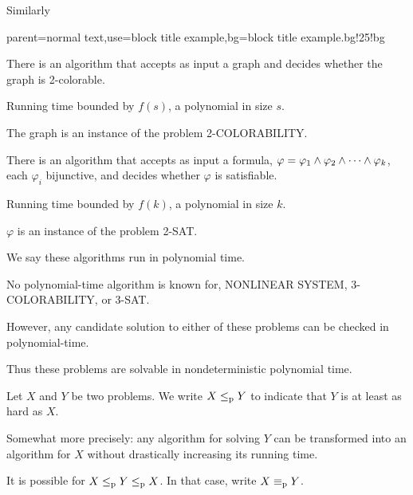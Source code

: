 \documentclass[12pt,xcolor=dvipsnames,mathserif%
   ]{beamer}
\newcommand{\bigpause}{\pause\bigskip}
\renewcommand{\.}{\cdot}
\newcommand{\reduc}{\leq_{\text{\textnormal{p}}}}
\newcommand{\equivp}{\equiv_{\text{\textnormal{p}}}}
\let\emph=\alert
\renewcommand{\phi}{\ensuremath{\varphi}}
\begin{document}
\begin{frame}
  Similarly

  {parent=normal text,use=block title example,bg=block title example.bg!25!bg}
  \begin{exampleblock}{}
    There is an algorithm that accepts as input a graph and decides
    whether the graph is 2-colorable.

    \smallskip
    Running time bounded by $f(s)$, a polynomial in 
    size $s$.
  \end{exampleblock}

  The graph is an \emph{instance} of the \emph{problem} 2-COLORABILITY.
  \begin{exampleblock}{}
  There is an algorithm that accepts as input a formula, $\phi = \phi_1 \meet \phi_2 \meet \cdots \meet \phi_k$, each $\phi_i$ bijunctive, and decides whether $\phi$ is satisfiable.
  
  \smallskip
  Running time bounded by $f(k)$, a polynomial in size $k$.
  \end{exampleblock}
  
  $\phi$ is an \emph{instance} of the \emph{problem} 2-SAT.

  We say these algorithms run in \emph{polynomial time}.
\end{frame}

\begin{frame}
  No polynomial-time algorithm is known for, NONLINEAR SYSTEM,
  3-COLORABILITY, or 3-SAT.

  \bigpause
  However, any candidate solution to either of these problems can be
  checked in polynomial-time. 

  \bigpause
  Thus these problems are solvable in \emph{nondeterministic polynomial
    time.} 
\end{frame}

\begin{frame}
  Let $X$ and $Y$ be two problems. We write $X \reduc Y$ to indicate that
  $Y$ is at least as hard as $X$.

  \bigpause
  Somewhat more precisely: any algorithm for solving $Y$ can be
  transformed into an algorithm for $X$ without drastically increasing
  its running time.

  \bigpause
  It is possible for $X\reduc Y \reduc X$. In that case, write $X\equivp
  Y$. 

\end{frame}
\end{document}
